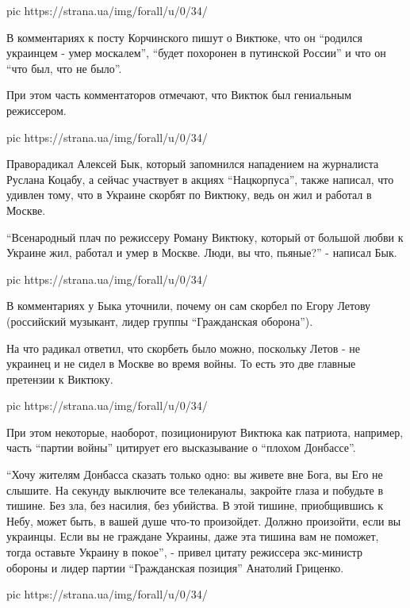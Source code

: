 \ifcmt
pic https://strana.ua/img/forall/u/0/34/%
\fi

В комментариях к посту Корчинского пишут о Виктюке, что он \enquote{родился
украинцем - умер москалем}, \enquote{будет похоронен в путинской России} и что он
\enquote{что был, что не было}.

При этом часть комментаторов отмечают, что Виктюк был гениальным
режиссером.

\ifcmt
pic https://strana.ua/img/forall/u/0/34/%
\fi

Праворадикал Алексей Бык, который запомнился нападением на журналиста
Руслана Коцабу, а сейчас участвует в акциях \enquote{Нацкорпуса}, также написал,
что удивлен тому, что в Украине скорбят по Виктюку, ведь он жил и работал
в Москве.

\enquote{Всенародный плач по режиссеру Роману Виктюку, который от большой любви к
Украине жил, работал и умер в Москве. Люди, вы что, пьяные?} - написал
Бык.

\ifcmt
pic https://strana.ua/img/forall/u/0/34/%
\fi

В комментариях у Быка уточнили, почему он сам скорбел по Егору Летову
(российский музыкант, лидер группы \enquote{Гражданская оборона}).

На что радикал ответил, что скорбеть было можно, поскольку Летов - не
украинец и не сидел в Москве во время войны. То есть это две главные
претензии к Виктюку.

\ifcmt
pic https://strana.ua/img/forall/u/0/34/%
\fi

При этом некоторые, наоборот, позиционируют Виктюка как патриота,
например, часть \enquote{партии войны} цитирует его высказывание о \enquote{плохом
Донбассе}.

\enquote{Хочу жителям Донбасса сказать только одно: вы живете вне Бога, вы Его не
слышите. На секунду выключите все телеканалы, закройте глаза и побудьте в
тишине. Без зла, без насилия, без убийства. В этой тишине, приобщившись к
Небу, может быть, в вашей душе что-то произойдет. Должно произойти, если
вы украинцы. Если вы не граждане Украины, даже эта тишина вам не поможет,
тогда оставьте Украину в покое}, - привел цитату режиссера экс-министр
обороны и лидер партии \enquote{Гражданская позиция} Анатолий Гриценко.

\ifcmt
pic https://strana.ua/img/forall/u/0/34/%
\fi

